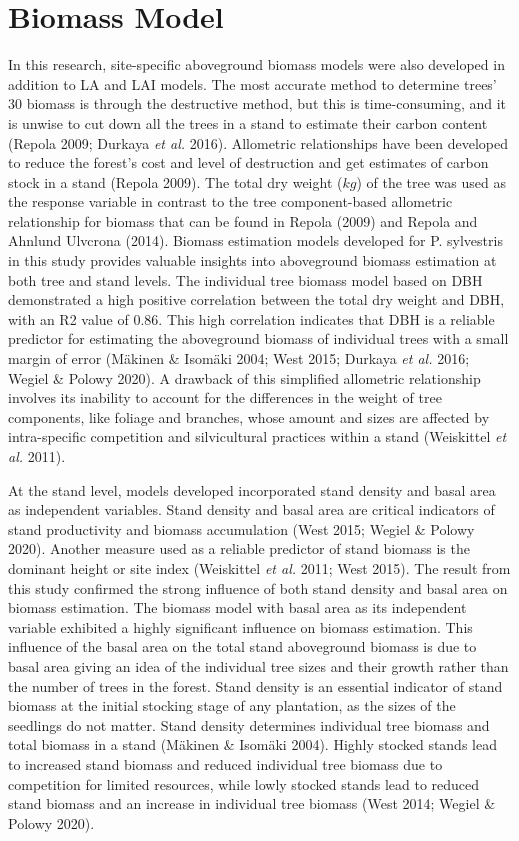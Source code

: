 \documentclass[11pt, a4paper]{report}
\begin{document}
\section{Biomass Model}
In this research, site-specific aboveground biomass models were also developed in addition to LA and LAI models. The most accurate method to determine trees' 30 biomass is through the destructive method, but this is time-consuming, and it is unwise to cut down all the trees in a stand to estimate their carbon content (Repola 2009; Durkaya \textit{et al.} 2016). Allometric relationships have been developed to reduce the forest's cost and level of destruction and get estimates of carbon stock in a stand (Repola 2009). The total dry weight ($kg$) of the tree was used as the response variable in contrast to the tree component-based allometric relationship for biomass that can be found in Repola (2009) and Repola and Ahnlund Ulvcrona (2014). Biomass estimation models developed for P. sylvestris in this study provides valuable insights into aboveground biomass estimation at both tree and stand levels. The individual tree biomass model based on DBH demonstrated a high positive correlation between the total dry weight and DBH, with an R2 value of $0.86$. This high correlation indicates that DBH is a reliable predictor for estimating the aboveground biomass of individual trees with a small margin of error (Mäkinen \& Isomäki 2004; West 2015; Durkaya \textit{et al.} 2016; Wegiel \& Polowy 2020). A drawback of this simplified allometric relationship involves its inability to account for the differences in the weight of tree components, like foliage and branches, whose amount and sizes are affected by intra-specific competition and silvicultural practices within a stand (Weiskittel \textit{et al.} 2011). 

At the stand level, models developed incorporated stand density and basal area as independent variables. Stand density and basal area are critical indicators of stand productivity and biomass accumulation (West 2015; Wegiel \& Polowy 2020). Another measure used as a reliable predictor of stand biomass is the dominant height or site index (Weiskittel \textit{et al.} 2011; West 2015). The result from this study confirmed the strong influence of both stand density and basal area on biomass estimation. The biomass model with basal area as its independent variable exhibited a highly significant influence on biomass estimation. This influence of the basal area on the total stand aboveground biomass is due to basal area giving an idea of the individual tree sizes and their growth rather than the number of trees in the forest. Stand density is an essential indicator of stand biomass at the initial stocking stage of any plantation, as the sizes of the seedlings do not matter. Stand density determines individual tree biomass and total biomass in a stand (Mäkinen \& Isomäki 2004). Highly stocked stands lead to increased stand biomass and reduced individual tree biomass due to competition for limited resources, while lowly stocked stands lead to reduced stand biomass and an increase in individual tree biomass (West 2014; Wegiel \& Polowy 2020).
\end{document}

